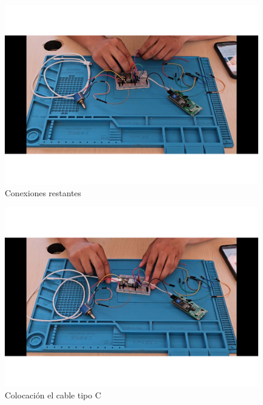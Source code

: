     
    \begin{figure}[H]
        \centering
        \includegraphics[trim = {25mm 25mm 25mm 10mm},clip,scale=0.3]{22/Img/ev3.pdf}
        \caption{Conexiones restantes}
        \label{fig:ev3}
    \end{figure}
    
    
    
    
    \begin{figure}[H]
        \centering
        \includegraphics[trim = {25mm 25mm 25mm 10mm},clip,scale=0.3]{22/Img/ev4.pdf}
        \caption{Colocación el cable tipo C}
        \label{fig:ev4}
    \end{figure}
    
